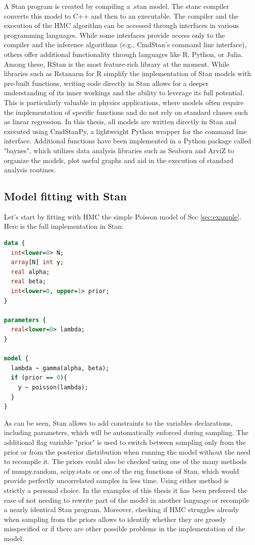 A Stan program is created by compiling a .stan model. The stanc compiler converts this model to C++ and then to an executable. The compiler and the execution of the HMC algorithm can be accessed through interfaces in various programming languages. While some interfaces provide access only to the compiler and the inference algorithms (e.g., CmdStan's command line interface), others offer additional functionality through languages like R, Python, or Julia. Among these, RStan is the most feature-rich library at the moment.
While libraries such as Rstanarm for R simplify the implementation of Stan models with pre-built functions, writing code directly in Stan allows for a deeper understanding of its inner workings and the ability to leverage its full potential. This is particularly valuable in physics applications, where models often require the implementation of specific functions and do not rely on standard classes such as linear regression.
In this thesis, all models are written directly in Stan and executed using CmdStanPy, a lightweight Python wrapper for the command line interface. Additional functions have been implemented in a Python package called "baynes", which utilizes data analysis libraries such as Seaborn and ArviZ to organize the models, plot useful graphs and aid in the execution of standard analysis routines.

\subsection{Model fitting with Stan}
Let's start by fitting with HMC the simple Poisson model of Sec \ref{sec:example}.
Here is the full implementation in Stan:
\begin{lstlisting}[language=Stan]
data {
  int<lower=0> N;
  array[N] int y;
  real alpha;
  real beta;
  int<lower=0, upper=1> prior;
}

parameters {
  real<lower=0> lambda;
}

model {
  lambda ~ gamma(alpha, beta);
  if (prior == 0){
    y ~ poisson(lambda);
  }
}
\end{lstlisting}
As can be seen, Stan allows to add constraints to the variables declarations, including parameters, which will be automatically enforced during sampling. The additional flag variable "prior" is used to switch between sampling only from the prior or from the posterior distribution when running the model without the need to recompile it.
The priors could also be checked using one of the many methods of numpy.random, scipy.stats or one of the rng functions of Stan, which would provide perfectly uncorrelated samples in less time.
Using either method is strictly a personal choice. In the examples of this thesis it has been preferred the ease of not
needing to rewrite part of the model in another language or recompile a nearly identical Stan program. Moreover,
checking if HMC struggles already when sampling from the priors allows to identify whether they are grossly
misspecified or if there are other possible problems in the implementation of the model.


